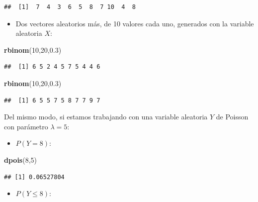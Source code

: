 \documentclass[]{book}
\newenvironment{Shaded}{\begin{snugshade}}{\end{snugshade}}
\newcommand{\DecValTok}[1]{\textcolor[rgb]{0.00,0.00,0.81}{#1}}
\newcommand{\FloatTok}[1]{\textcolor[rgb]{0.00,0.00,0.81}{#1}}
\newcommand{\KeywordTok}[1]{\textcolor[rgb]{0.13,0.29,0.53}{\textbf{#1}}}
\newcommand{\NormalTok}[1]{#1}
\providecommand{\tightlist}{%
  \setlength{\itemsep}{0pt}\setlength{\parskip}{0pt}}
\theoremstyle{definition}
\theoremstyle{definition}
\theoremstyle{definition}
\theoremstyle{remark}
\begin{document}
\begin{verbatim}
##  [1]  7  4  3  6  5  8  7 10  4  8
\end{verbatim}

\begin{itemize}
\tightlist
\item
  Dos vectores aleatorios más, de 10 valores cada uno, generados con la variable aleatoria \(X\):
\end{itemize}

\begin{Shaded}
\begin{Highlighting}[]
\KeywordTok{rbinom}\NormalTok{(}\DecValTok{10}\NormalTok{,}\DecValTok{20}\NormalTok{,}\FloatTok{0.3}\NormalTok{) }
\end{Highlighting}
\end{Shaded}

\begin{verbatim}
##  [1] 6 5 2 4 5 7 5 4 4 6
\end{verbatim}

\begin{Shaded}
\begin{Highlighting}[]
\KeywordTok{rbinom}\NormalTok{(}\DecValTok{10}\NormalTok{,}\DecValTok{20}\NormalTok{,}\FloatTok{0.3}\NormalTok{)}
\end{Highlighting}
\end{Shaded}

\begin{verbatim}
##  [1] 6 5 5 7 5 8 7 7 9 7
\end{verbatim}

Del mismo modo, si estamos trabajando con una variable aleatoria \(Y\) de Poisson con parámetro \(\lambda=5\):

\begin{itemize}
\tightlist
\item
  \(P(Y=8)\):
\end{itemize}

\begin{Shaded}
\begin{Highlighting}[]
\KeywordTok{dpois}\NormalTok{(}\DecValTok{8}\NormalTok{,}\DecValTok{5}\NormalTok{) }
\end{Highlighting}
\end{Shaded}

\begin{verbatim}
## [1] 0.06527804
\end{verbatim}

\begin{itemize}
\tightlist
\item
  \(P(Y\leqslant 8)\):
\end{itemize}
\end{document}
